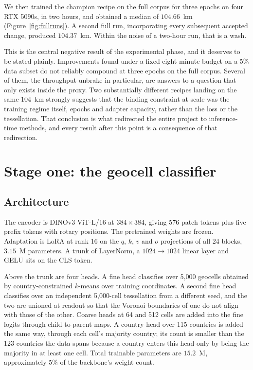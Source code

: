 \documentclass[11pt,a4paper]{article}
\begin{document}
We then trained the champion recipe on the full corpus for three epochs on four RTX 5090s,
in two hours, and obtained a median of $104.66$~km (Figure~\ref{fig:fullruns}). A second
full run, incorporating every subsequent accepted change, produced $104.37$~km. Within the noise of
a two-hour run, that is a wash.

This is the central negative result of the experimental phase, and it deserves to be stated
plainly. Improvements found under a fixed eight-minute budget on a $5\%$ data subset do not
reliably compound at three epochs on the full corpus. Several of them, the throughput
unbrake in particular, are answers to a question that only exists inside the proxy. Two
substantially different recipes landing on the same $104$~km strongly suggests that the
binding constraint at scale was the training regime itself, epochs and adapter capacity,
rather than the loss or the tessellation. That conclusion is what redirected the entire
project to inference-time methods, and every result after this point is a consequence of
that redirection.

\section{Stage one: the geocell classifier}

\subsection{Architecture}

The encoder is DINOv3 ViT-L/16 at $384 \times 384$, giving 576 patch tokens plus five prefix
tokens with rotary positions. The pretrained weights are frozen. Adaptation is LoRA at rank
16 on the $q$, $k$, $v$ and $o$ projections of all 24 blocks, $3.15$~M parameters. A trunk of
LayerNorm, a $1024 \rightarrow 1024$ linear layer and GELU sits on the CLS token.

Above the trunk are four heads. A fine head classifies over 5{,}000 geocells obtained by
country-constrained $k$-means over training coordinates. A second fine head classifies over
an independent 5{,}000-cell tessellation from a different seed, and the two are unioned at
readout so that the Voronoi boundaries of one do not align with those of the other. Coarse
heads at 64 and 512 cells are added into the fine logits through child-to-parent maps. A
country head over 115 countries is added the same way, through each cell's majority country;
its count is smaller than the 123 countries the data spans because a country enters this
head only by being the majority in at least one cell.
Total trainable parameters are $15.2$~M, approximately $5\%$ of the backbone's weight count.
\end{document}
